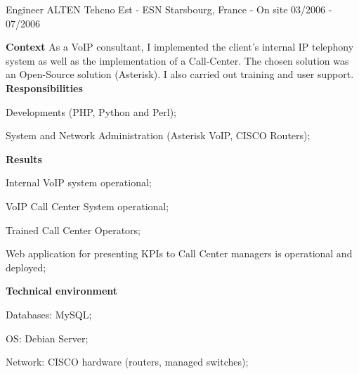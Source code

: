 \begin{cventries}
  \cventry
    {Engineer} %
    {ALTEN Tehcno Est - ESN} %
    {Starsbourg, France - On site} %
    {03/2006 - 07/2006} %
    {
      \textbf{Context}
      \newline
      As a VoIP consultant, I implemented the client's internal IP telephony system 
      as well as the implementation of a Call-Center. The chosen solution was an 
      Open-Source solution (Asterisk). 
      \newline
      I also carried out training and user support.
      \newline \vspace{2pt}
      \textbf{Responsibilities}
      \newline \vspace{12pt}
      \begin{cvitems}
        \item {Developments (PHP, Python and Perl);}
        \item {System and Network Administration (Asterisk VoIP, CISCO Routers);}
      \end{cvitems}
      \textbf{Results}
      \newline \vspace{12pt}
      \begin{cvitems}
        \item {Internal VoIP system operational;}
        \item {VoIP Call Center System operational;}
        \item {Trained Call Center Operators;}
        \item {Web application for presenting KPIs to Call Center managers is operational and deployed;}
      \end{cvitems}
      \textbf{Technical environment}
      \newline \vspace{12pt}
      \begin{cvitems}
        \item {Databases: MySQL;}
        \item {OS: Debian Server;}
        \item {Network: CISCO hardware (routers, managed switches);}
      \end{cvitems}
    }


\end{cventries}
